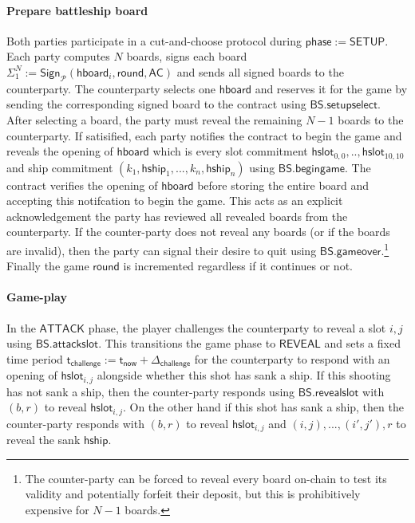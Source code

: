 \documentclass{llncs}
\newcommand{\gamestatus}{\mathsf{phase}}
\newcommand{\gamesetup}{\mathsf{SETUP}}
\newcommand{\gameattack}{\mathsf{ATTACK}}
\newcommand{\gamereveal}{\mathsf{REVEAL}}
\newcommand{\hboard}{\mathsf{hboard}}
\newcommand{\hslot}{\mathsf{hslot}}
\newcommand{\hship}{\mathsf{hship}}
\newcommand{\participant}{\mathcal{P}}
\newcommand{\sign}{\mathsf{Sign}}
\newcommand{\battleshipattackslot}{\mathsf{BS.attackslot}}
\newcommand{\battleshipbegin}{\mathsf{BS.begingame}}
\newcommand{\battleshipselectboard}{\mathsf{BS.setupselect}}
\newcommand{\battleshiprevealslot}{\mathsf{BS.revealslot}}
\newcommand{\battleshipgameover}{\mathsf{BS.gameover}}
\newcommand{\appcontract}{\mathsf{AC}}
\newcommand{\timerchallenge}{\mathsf{\Delta}_{\mathsf{challenge}}}
\newcommand{\timechallenge}{\mathsf{t}_{\mathsf{challenge}}}
\newcommand{\timenow}{\mathsf{t}_{\mathsf{now}}}
\begin{document}
\paragraph{Prepare battleship board} Both parties participate in a cut-and-choose protocol during $\gamestatus := \gamesetup$. 
Each party computes $N$ boards, signs each board $\Sigma_{1}^{N} := \sign_{\participant}(\hboard_{i}, \mathsf{round}, \appcontract)$ and sends all signed boards to the counterparty. 
The counterparty selects one $\hboard$  and reserves it for the game by sending the corresponding signed board to the contract using $\battleshipselectboard$. 
After selecting a board, the party must reveal the remaining $N-1$ boards to the counterparty. 
If satisified, each party notifies the contract to begin the game and reveals the opening of $\hboard$ which is every slot commitment $\hslot_{0,0},..,\hslot_{10,10}$ and ship commitment $(k_{1},\hship_{1},...,k_{n},\hship_{n})$ using $\battleshipbegin$.
The contract verifies the opening of $\hboard$ before storing the entire board and accepting this notifcation to begin the game.
This acts as an explicit acknowledgement the party has reviewed all revealed boards from the counterparty.
If the counter-party does not reveal any boards (or if the boards are invalid), then the party can signal their desire to quit  using $\battleshipgameover$.\footnote{The counter-party can be forced to reveal every board on-chain to test its validity and potentially forfeit their deposit, but this is prohibitively expensive for $N-1$ boards.}
Finally the game $\mathsf{round}$ is incremented regardless if it continues or not. 

\paragraph{Game-play} \label{sec:gameplay}

In the $\gameattack$ phase, the player challenges the counterparty to reveal a slot $i,j$ using $\battleshipattackslot$.
This transitions the game phase to $\gamereveal$ and sets a fixed time period $\timechallenge := \timenow + \timerchallenge$ for the counterparty to respond with an opening of $\hslot_{i,j}$ alongside whether this shot has sank a ship.
If this shooting has not sank a ship, then the counter-party responds using $\battleshiprevealslot$ with $(b,r)$ to reveal $\hslot_{i,j}$. 
On the other hand if this shot has sank a ship, then the counter-party responds with $(b,r)$ to reveal $\hslot_{i,j}$ and $(i,j),...,(i',j'),r$ to reveal the sank $\hship$. 
\end{document}
